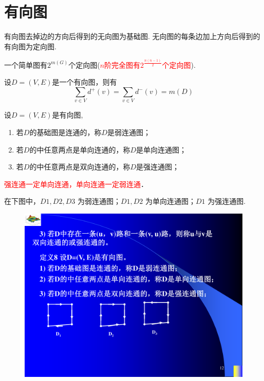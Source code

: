 \section{有向图}

\begin{definition}
	有向图去掉边的方向后得到的无向图为基础图. 无向图的每条边加上方向后得到的有向图为定向图.
\end{definition}
\begin{note}
	一个简单图有$2^{m(G)}$个定向图(\textcolor{red}{$n$阶完全图有$2^{\frac{n(n-1)}{2}}$个定向图}).
\end{note}

\begin{theorem}
	设$D=(V,E)$是一个有向图，则有
	\[
	\sum\limits_{v\in V}d^{+}(v)=\sum\limits_{v\in V}d^{-}(v)=m(D)
	\]
\end{theorem}

\begin{definition}
	设$D=(V, E)$是有向图,
\begin{enumerate}
	\item 若$D$的基础图是连通的，称$D$是弱连通图；
	\item 若$D$的中任意两点是单向连通的，称$D$是单向连通图；
	\item 若$D$的中任意两点是双向连通的，称$D$是强连通图；
\end{enumerate}
\end{definition}

\begin{note}
	\textcolor{red}{强连通一定单向连通，单向连通一定弱连通}．
\end{note}


\begin{example}
	在下图中，$D1, D2, D3$ 为弱连通图；$D1, D2$ 为单向连通图；$D1$ 为强连通图.
	\begin{figure}[H]
		\small
		\centering 
		\includegraphics[scale=0.6]{image/CH9_liantong.pdf}  
		\label{figkk1ijjj}  
	\end{figure}
\end{example}

